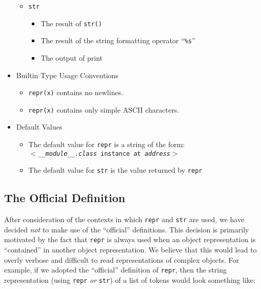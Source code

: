 \documentclass[11pt]{article}
\begin{document}
\begin{itemize}
\begin{itemize}
      \item \texttt{str}
      \begin{itemize}
        \item The result of \texttt{str()}
        \item The result of the string formatting operator 
            ``\texttt{\%s}''
        \item The output of print
      \end{itemize}

    \end{itemize}

    \item Builtin Type Usage Conventions
    \begin{itemize}
      \item \texttt{repr(x)} contains no newlines.
      \item \texttt{repr(x)} contains only simple ASCII characters.
    \end{itemize}

    \item Default Values
    \begin{itemize}
      \item The default value for \texttt{repr} is a string of the form:\\
        \texttt{$<$\_\_\textit{module}\_\_.\textit{class} instance at \textit{address}$>$}
      \item The default value for \texttt{str} is the value returned
        by \texttt{repr}
    \end{itemize}

  \end{itemize}

  \subsection{The Official Definition}

    After consideration of the contexts in which \texttt{repr} and
    \texttt{str} are used, we have decided \emph{not} to make use of
    the ``official'' definitions.  This decision is primarily
    motivated by the fact that \texttt{repr} is always used when an
    object representation is ``contained'' in another object
    representation.  We believe that this would lead to overly verbose
    and difficult to read representations of complex objects.  For
    example, if we adopted the ``official'' definition of
    \texttt{repr}, then the string representation (using \texttt{repr}
    \emph{or} \texttt{str}) of a list of tokens would look something
    like:
\end{document}
